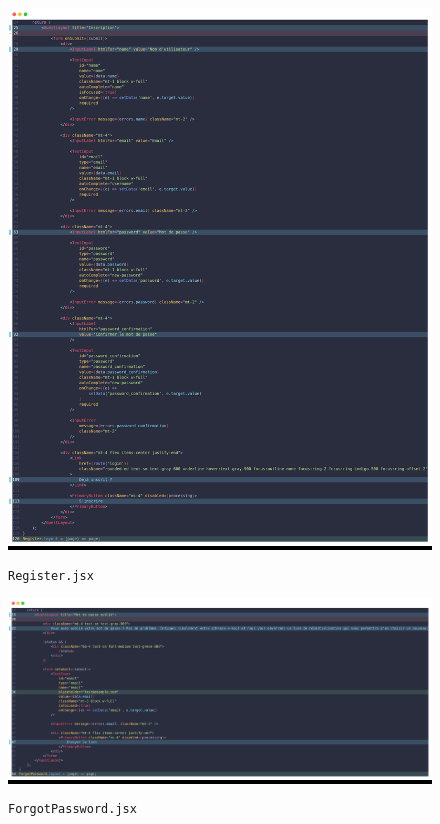 \begin{figure}[h]
    \centering
    \begin{minipage}[t]{0.45\textwidth}
        \colorbox{black}{\includegraphics[width=\textwidth]{figures-C1/register.png}}
        \caption{\texttt{Register.jsx}}
        \label{fig:register}
    \end{minipage}
    \hfill
    \begin{minipage}[t]{0.45\textwidth}
        \colorbox{black}{\includegraphics[width=\textwidth]{figures-C1/forgotpassword.png}}
        \caption{\texttt{ForgotPassword.jsx}}
        \label{fig:forgotpassword}
    \end{minipage}
    
\end{figure}


